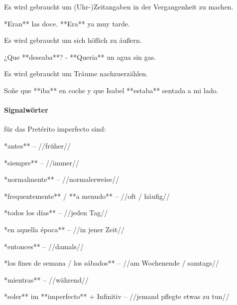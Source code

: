 \begin{highlight}
    Es wird gebraucht um (Uhr-)Zeitangaben in der Vergangenheit zu machen.
\end{highlight}

\begin{compactitem}
    \item  **Eran** las doce. **Era** ya muy tarde.
\end{compactitem}


\begin{highlight}
    Es wird gebraucht um sich höflich zu äußern.
\end{highlight}

\begin{compactitem}
    \item  ¿Que **deseaba**? - **Queria** un agua sin gas.
\end{compactitem}


\begin{highlight}
    Es wird gebraucht um Träume nachzuerzählen.
\end{highlight}

\begin{compactitem}
    \item  Soñe que **iba** en coche y que Isabel **estaba** sentada a mi lado.
\end{compactitem}


\paragraph{Signalwörter} für das Pretérito imperfecto sind:

\begin{compactitem}
    \item  **antes** -- //früher//
    \item **siempre** -- //immer//
    \item **normalmente** -- //normalerweise//
    \item **frequentemente** / **a menudo** -- //oft / häufig//
    \item **todos los días** -- //jeden Tag//
    \item **en aquella época** -- //in jener Zeit//
    \item **entonces** -- //damals//
    \item **los fines de semana / los sábados** -- //am Wochenende / samtags//
    \item **mientras** -- //während//
    \item **soler** im **imperfecto** + Infinitiv -- //jemand pflegte etwas zu tun//
\end{compactitem}

